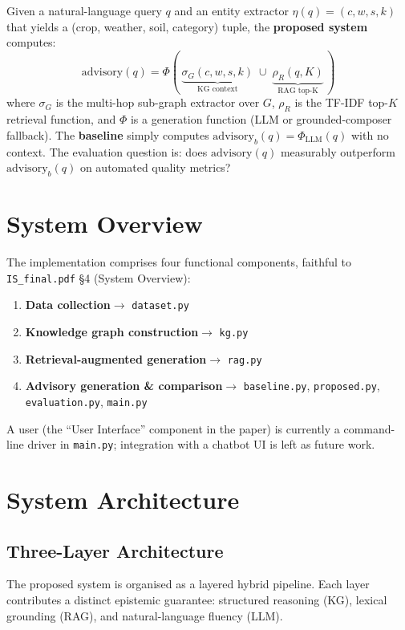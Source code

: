 \documentclass[11pt,a4paper]{article}
\begin{document}
Given a natural-language query $q$ and an entity extractor
$\eta(q) = (c, w, s, k)$ that yields a (crop, weather, soil, category)
tuple, the \textbf{proposed system} computes:
\[
\mathrm{advisory}(q) =
\Phi\!\left(\,\underbrace{\sigma_G(c, w, s, k)}_{\text{KG context}}
            \;\cup\;
            \underbrace{\rho_R(q, K)}_{\text{RAG top-K}}\,\right)
\]
where $\sigma_G$ is the multi-hop sub-graph extractor over $G$,
$\rho_R$ is the TF-IDF top-$K$ retrieval function, and $\Phi$ is a
generation function (LLM or grounded-composer fallback). The
\textbf{baseline} simply computes
$\mathrm{advisory}_b(q) = \Phi_{\text{LLM}}(q)$ with no context. The
evaluation question is: does $\mathrm{advisory}(q)$ measurably
outperform $\mathrm{advisory}_b(q)$ on automated quality metrics?

\section{System Overview}\label{sec:overview}

The implementation comprises four functional components, faithful to
\texttt{IS\_final.pdf} \S4 (System Overview):

\begin{enumerate}[leftmargin=*]
  \item \textbf{Data collection}\quad $\to$ \texttt{dataset.py}
  \item \textbf{Knowledge graph construction}\quad $\to$ \texttt{kg.py}
  \item \textbf{Retrieval-augmented generation}\quad $\to$
        \texttt{rag.py}
  \item \textbf{Advisory generation \& comparison}\quad $\to$
        \texttt{baseline.py}, \texttt{proposed.py},
        \texttt{evaluation.py}, \texttt{main.py}
\end{enumerate}

A user (the ``User Interface'' component in the paper) is currently a
command-line driver in \texttt{main.py}; integration with a chatbot
UI is left as future work.

\section{System Architecture}\label{sec:architecture}

\subsection{Three-Layer Architecture}\label{sec:three-layer}
The proposed system is organised as a layered hybrid pipeline. Each
layer contributes a distinct epistemic guarantee: structured reasoning
(KG), lexical grounding (RAG), and natural-language fluency (LLM).
\end{document}
